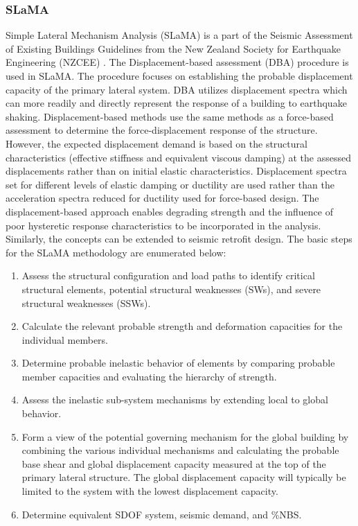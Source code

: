 \subsubsection{SLaMA}

Simple Lateral Mechanism Analysis (SLaMA) is a part of the Seismic Assessment of Existing Buildings Guidelines from the New Zealand Society for Earthquake Engineering (NZCEE) \cite{NZSEE2019}. The  Displacement-based assessment (DBA) procedure is used in SLaMA. The procedure focuses on establishing the probable displacement capacity of the primary lateral system. DBA utilizes displacement spectra which can more readily and directly represent the response of a building to earthquake shaking. Displacement-based methods use the same methods as a force-based assessment to determine the force-displacement response of the structure. However, the expected displacement demand is based on the structural characteristics (effective stiffness and equivalent viscous damping) at the assessed displacements rather than on initial elastic characteristics. Displacement spectra set for different levels of elastic damping or ductility are used rather than the acceleration spectra reduced for ductility used for force-based design. The displacement-based approach enables degrading strength and the influence of poor
hysteretic response characteristics to be incorporated in the analysis. Similarly, the concepts can be extended to seismic retrofit design. The basic steps for the SLaMA methodology are enumerated below:

\begin{enumerate}
    \item Assess the structural configuration and load paths to identify critical structural elements, potential structural weaknesses (SWs), and severe structural weaknesses (SSWs).
    \item Calculate the relevant probable strength and deformation capacities for the individual members.
    \item Determine probable inelastic behavior of elements by comparing probable member capacities and evaluating the hierarchy of strength.
    \item Assess the inelastic sub-system mechanisms by extending local to global behavior.
    \item Form a view of the potential governing mechanism for the global building by combining the various individual mechanisms and calculating the probable base shear and global displacement capacity measured at the top of the primary lateral structure. The global displacement capacity will typically be limited to the system with the lowest displacement capacity.
    \item Determine equivalent SDOF system, seismic demand, and \%NBS.
\end{enumerate}

